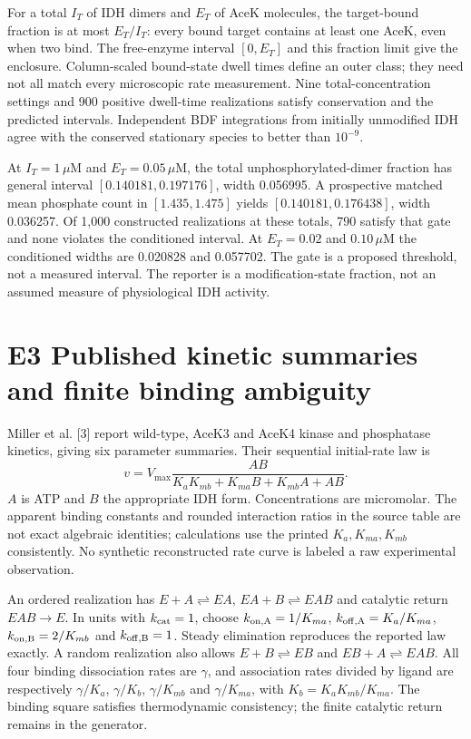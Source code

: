 \documentclass[11pt]{article}
\begin{document}
For a total $I_T$ of IDH dimers and $E_T$ of AceK molecules, the target-bound fraction is at most $E_T/I_T$: every bound target contains at least one AceK, even when two bind. The free-enzyme interval $[0,E_T]$ and this fraction limit give the enclosure. Column-scaled bound-state dwell times define an outer class; they need not all match every microscopic rate measurement. Nine total-concentration settings and 900 positive dwell-time realizations satisfy conservation and the predicted intervals. Independent BDF integrations from initially unmodified IDH agree with the conserved stationary species to better than $10^{-9}$.

At $I_T=1\,\mu$M and $E_T=0.05\,\mu$M, the total unphosphorylated-dimer fraction has general interval $[0.140181,0.197176]$, width 0.056995. A prospective matched mean phosphate count in $[1.435,1.475]$ yields $[0.140181,0.176438]$, width 0.036257. Of 1,000 constructed realizations at these totals, 790 satisfy that gate and none violates the conditioned interval. At $E_T=0.02$ and $0.10\,\mu$M the conditioned widths are 0.020828 and 0.057702. The gate is a proposed threshold, not a measured interval. The reporter is a modification-state fraction, not an assumed measure of physiological IDH activity.

\section*{E3 Published kinetic summaries and finite binding ambiguity}
Miller et al. [3] report wild-type, AceK3 and AceK4 kinase and phosphatase kinetics, giving six parameter summaries. Their sequential initial-rate law is
\begin{equation}
 v=V_{\max}\frac{AB}{K_aK_{mb}+K_{ma}B+K_{mb}A+AB}.
\end{equation}
$A$ is ATP and $B$ the appropriate IDH form. Concentrations are micromolar. The apparent binding constants and rounded interaction ratios in the source table are not exact algebraic identities; calculations use the printed $K_a,K_{ma},K_{mb}$ consistently. No synthetic reconstructed rate curve is labeled a raw experimental observation.

An ordered realization has $E+A\rightleftharpoons EA$, $EA+B\rightleftharpoons EAB$ and catalytic return $EAB\to E$. In units with $k_{\rm cat}=1$, choose $k_{\rm on,A}=1/K_{ma}$, $k_{\rm off,A}=K_a/K_{ma}$, $k_{\rm on,B}=2/K_{mb}$ and $k_{\rm off,B}=1$. Steady elimination reproduces the reported law exactly. A random realization also allows $E+B\rightleftharpoons EB$ and $EB+A\rightleftharpoons EAB$. All four binding dissociation rates are $\gamma$, and association rates divided by ligand are respectively $\gamma/K_a$, $\gamma/K_b$, $\gamma/K_{mb}$ and $\gamma/K_{ma}$, with $K_b=K_aK_{mb}/K_{ma}$. The binding square satisfies thermodynamic consistency; the finite catalytic return remains in the generator.
\end{document}
